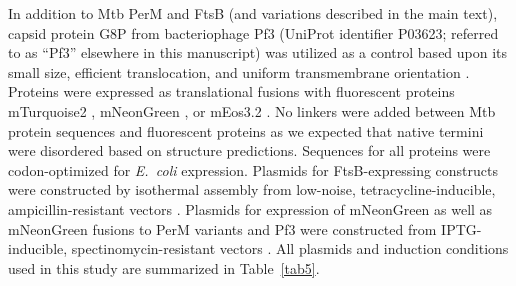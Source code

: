\documentclass[twocolumn,pdflatex,sn-nature]{sn-jnl}%
\newcommand\ec{\textit{E.~coli}}
\newcommand\mtb{Mtb}
\begin{document}
In addition to \mtb{} PerM and FtsB (and variations described in the main text), capsid protein G8P from bacteriophage Pf3 (UniProt identifier P03623; referred to as ``Pf3'' elsewhere in this manuscript) was utilized as a control based upon its small size, efficient translocation, and uniform transmembrane orientation \citep{kieferNegativelyChargedAmino1997}.
Proteins were expressed as translational fusions with fluorescent proteins mTurquoise2 \citep{goedhartStructureguidedEvolutionCyan2012}, mNeonGreen \citep{shanerBrightMonomericGreen2013}, or mEos3.2 \cite{zhangRationalDesignTrue2012}.
No linkers were added between \mtb{} protein sequences and fluorescent proteins as we expected that native termini were disordered based on structure predictions.
Sequences for all proteins were codon-optimized for \ec{} expression.
Plasmids for FtsB-expressing constructs were constructed by isothermal assembly from low-noise, tetracycline-inducible, ampicillin-resistant vectors \citep{henselPlasmidbasedEscherichiaColi2017}.
Plasmids for expression of mNeonGreen as well as mNeonGreen fusions to PerM variants and Pf3 were constructed from IPTG-inducible, spectinomycin-resistant vectors \citep{silvaPlasmidsIndependentlyTunable2019}.
All plasmids and induction conditions used in this study are summarized in Table~\ref{tab5}.
\end{document}
